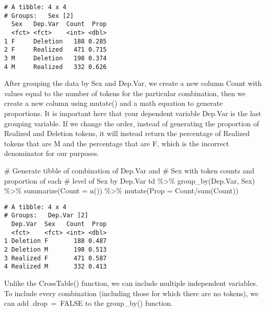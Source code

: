 \documentclass[
  12pt,
  letterpaper]{article}
\newenvironment{Shaded}{\begin{snugshade}}{\end{snugshade}}
\newcommand{\AttributeTok}[1]{\textcolor[rgb]{0.40,0.45,0.13}{#1}}
\newcommand{\CommentTok}[1]{\textcolor[rgb]{0.37,0.37,0.37}{#1}}
\newcommand{\FunctionTok}[1]{\textcolor[rgb]{0.28,0.35,0.67}{#1}}
\newcommand{\NormalTok}[1]{\textcolor[rgb]{0.00,0.23,0.31}{#1}}
\newcommand{\SpecialCharTok}[1]{\textcolor[rgb]{0.37,0.37,0.37}{#1}}
\renewcommand\texttt[1]{{\ttfamily\color{BrickRed}#1}}
\begin{document}
\begin{verbatim}
# A tibble: 4 x 4
# Groups:   Sex [2]
  Sex   Dep.Var  Count  Prop
  <fct> <fct>    <int> <dbl>
1 F     Deletion   188 0.285
2 F     Realized   471 0.715
3 M     Deletion   198 0.374
4 M     Realized   332 0.626
\end{verbatim}

After grouping the data by \texttt{Sex} and \texttt{Dep.Var}, we create
a new column \texttt{Count} with values equal to the number of tokens
for the particular combination, then we create a new column using
\texttt{mutate()} and a math equation to generate proportions. It is
important here that your dependent variable \texttt{Dep.Var} is the last
grouping variable. If we change the order, instead of generating the
proportion of \texttt{Realized} and \texttt{Deletion} tokens, it will
instead return the percentage of \texttt{Realized} tokens that are
\texttt{M} and the percentage that are \texttt{F}, which is the
incorrect denominator for our purposes.

\begin{Shaded}
\begin{Highlighting}[]
\CommentTok{\# Generate tibble of combination of Dep.Var and}
\CommentTok{\# Sex with token counts and proportion of each}
\CommentTok{\# level of Sex by Dep.Var}
\NormalTok{td }\SpecialCharTok{\%\textgreater{}\%}
    \FunctionTok{group\_by}\NormalTok{(Dep.Var, Sex) }\SpecialCharTok{\%\textgreater{}\%}
    \FunctionTok{summarize}\NormalTok{(}\AttributeTok{Count =} \FunctionTok{n}\NormalTok{()) }\SpecialCharTok{\%\textgreater{}\%}
    \FunctionTok{mutate}\NormalTok{(}\AttributeTok{Prop =}\NormalTok{ Count}\SpecialCharTok{/}\FunctionTok{sum}\NormalTok{(Count))}
\end{Highlighting}
\end{Shaded}

\begin{verbatim}
# A tibble: 4 x 4
# Groups:   Dep.Var [2]
  Dep.Var  Sex   Count  Prop
  <fct>    <fct> <int> <dbl>
1 Deletion F       188 0.487
2 Deletion M       198 0.513
3 Realized F       471 0.587
4 Realized M       332 0.413
\end{verbatim}

Unlike the \texttt{CrossTable()} function, we can include multiple
independent variables. To include every combination (including those for
which there are no tokens), we can add \texttt{.drop\ =\ FALSE} to the
\texttt{group\_by()} function.
\end{document}
